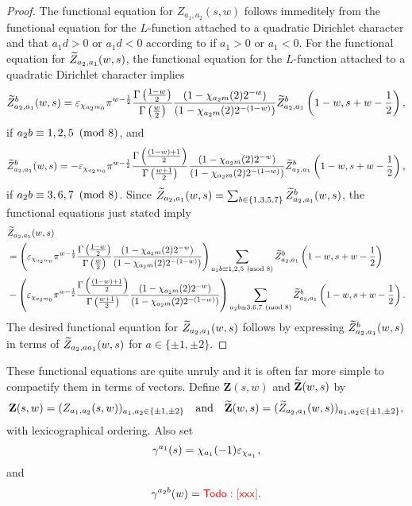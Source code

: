 \documentclass[12pt,reqno,oneside]{amsart}
\begin{document}
    \begin{proof}
        The functional equation for $Z_{a_{1},a_{2}}(s,w)$ follows immeditely from the functional equation for the $L$-function attached to a quadratic Dirichlet character and that $a_{1}d > 0$ or $a_{1}d < 0$ according to if $a_{1} > 0$ or $a_{1} < 0$. For the functional equation for $\widetilde{Z}_{a_{2},a_{1}}(w,s)$, the functional equation for the $L$-function attached to a quadratic Dirichlet character implies
        \[
            \widetilde{Z}_{a_{2},a_{1}}^{b}(w,s) = \varepsilon_{\chi_{a_{2}m_{0}}}\pi^{w-\frac{1}{2}}\frac{\Gamma\left(\frac{1-w}{2}\right)}{\Gamma\left(\frac{w}{2}\right)}\frac{(1-\chi_{a_{2}m}(2)2^{-w})}{(1-\chi_{a_{2}m}(2)2^{-(1-w)})}\widetilde{Z}_{a_{2},a_{1}}^{b}\left(1-w,s+w-\frac{1}{2}\right),
        \]
        if $a_{2}b \equiv 1,2,5 \ \left(\text{mod }8\right)$, and
        \[
            \widetilde{Z}_{a_{2},a_{1}}^{b}(w,s) = -\varepsilon_{\chi_{a_{2}m_{0}}}\pi^{w-\frac{1}{2}}\frac{\Gamma\left(\frac{(1-w)+1}{2}\right)}{\Gamma\left(\frac{w+1}{2}\right)}\frac{(1-\chi_{a_{2}m}(2)2^{-w})}{(1-\chi_{a_{2}m}(2)2^{-(1-w)})}\widetilde{Z}_{a_{2},a_{1}}^{b}\left(1-w,s+w-\frac{1}{2}\right),
        \]
        if $a_{2}b \equiv 3,6,7 \ \left(\text{mod }8\right)$. Since $\widetilde{Z}_{a_{2},a_{1}}(w,s) = \sum_{b \in \{1,3,5,7\}}\widetilde{Z}_{a_{2},a_{1}}^{b}(w,s)$, the functional equations just stated imply
        \begin{align*}
            &\widetilde{Z}_{a_{2},a_{1}}(w,s) \\
            &= \left(\varepsilon_{\chi_{a_{2}m_{0}}}\pi^{w-\frac{1}{2}}\frac{\Gamma\left(\frac{1-w}{2}\right)}{\Gamma\left(\frac{w}{2}\right)}\frac{(1-\chi_{a_{2}m}(2)2^{-w})}{(1-\chi_{a_{2}m}(2)2^{-(1-w)})}\right)\sum_{a_{2}b \equiv 1,2,5 \ \left(\text{mod }8\right)}\widetilde{Z}_{a_{2},a_{1}}^{b}\left(1-w,s+w-\frac{1}{2}\right) \\
            &- \left(\varepsilon_{\chi_{a_{2}m_{0}}}\pi^{w-\frac{1}{2}}\frac{\Gamma\left(\frac{(1-w)+1}{2}\right)}{\Gamma\left(\frac{w+1}{2}\right)}\frac{(1-\chi_{a_{2}m}(2)2^{-w})}{(1-\chi_{a_{2}m}(2)2^{-(1-w)})}\right)\sum_{a_{2}b \equiv 3,6,7 \ \left(\text{mod }8\right)}\widetilde{Z}_{a_{2},a_{1}}^{b}\left(1-w,s+w-\frac{1}{2}\right).
        \end{align*}
        The desired functional equation for $\widetilde{Z}_{a_{2},a_{1}}(w,s)$ follows by expressing $\widetilde{Z}_{a_{2},a_{1}}^{b}(w,s)$ in terms of $\widetilde{Z}_{a_{2},aa_{1}}(w,s)$ for $a \in \{\pm1,\pm2\}$.
    \end{proof}

    These functional equations are quite unruly and it is often far more simple to compactify them in terms of vectors. Define $\mathbf{Z}(s,w)$ and $\widetilde{\mathbf{Z}}(w,s)$ by
    \[
        \mathbf{Z}(s,w) = (Z_{a_{1},a_{2}}(s,w))_{a_{1},a_{2} \in \{\pm 1, \pm 2\}} \quad \text{and} \quad \widetilde{\mathbf{Z}}(w,s) = (\widetilde{Z}_{a_{2},a_{1}}(w,s))_{a_{1},a_{2} \in \{\pm 1, \pm 2\}},
    \]
    with lexicographical ordering. Also set
    \[
        \gamma^{a_{1}}(s) = \chi_{a_{1}}(-1)\varepsilon_{\chi_{a_{1}}},
    \]
    and
    \[
        \gamma^{a_{2}b}(w) = \textcolor{red}{\sf Todo: [xxx]}.
    \]
  
\end{document}
